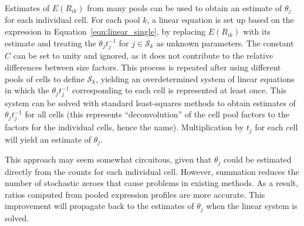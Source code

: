 \documentclass{bmcart}
\newcommand{\revised}[1]{#1}
\begin{document}
%

\revised{Estimates of $E(R_{ik})$ from many pools} can be used to obtain \revised{an estimate of} $\theta_j$ for each individual cell.
\revised{For each pool $k$, a} linear equation is set up based on the expression in Equation~\ref{eqn:linear_single}, 
by replacing \revised{$E(R_{ik})$} with its estimate and treating the $\theta_j t_j^{-1}$ \revised{for $j \in \mathcal{S}_k$} as unknown parameters.
The constant $C$ can be set to unity and ignored, as it does not contribute to the relative differences between size factors.
\revised{This process is repeated after using different pools of cells to define} $\mathcal{S}_{k}$, \revised{yielding an} overdetermined system of linear equations in which the $\theta_j t_j^{-1}$ \revised{corresponding to} each \revised{cell} is represented at least once.
This system can be solved with standard least-squares methods to obtain estimates of $\theta_j t_j^{-1}$ for all cells 
    (this represents ``deconvolution'' of the cell pool factors to the factors for the individual cells, hence the name).
Multiplication by $t_j$ for each cell will yield an estimate of $\theta_j$.

This approach may seem somewhat circuitous, given that $\theta_j$ could be estimated directly from the counts for each individual cell.
However, summation reduces the number of stochastic zeroes that cause problems in existing methods.
As a result, ratios computed from pooled expression profiles are more accurate.
This improvement will propagate back to the estimates of $\theta_j$ when the linear system is solved.
\end{document}
